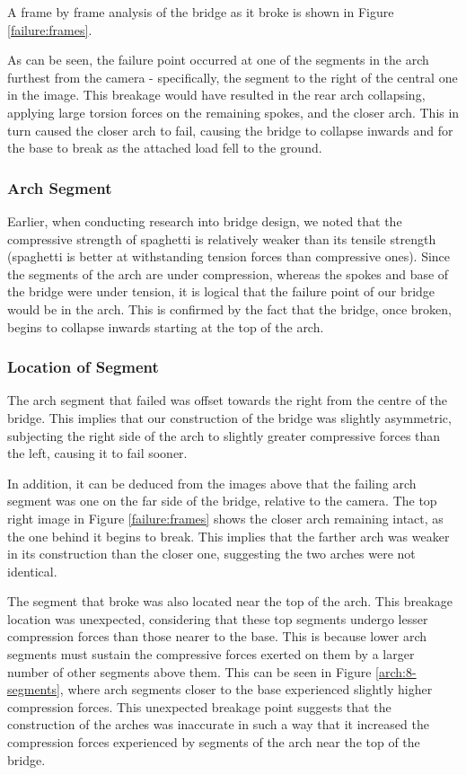 \documentclass[a4paper,11pt]{article}
\begin{document}
A frame by frame analysis of the bridge as it broke is shown in Figure
\ref{failure:frames}.

As can be seen, the failure point occurred at one of the segments in the arch
furthest from the camera - specifically, the segment to the right of the
central one in the image.
This breakage would have resulted in the rear arch collapsing, applying large
torsion forces on the remaining spokes, and the closer arch.
This in turn caused the closer arch to fail, causing the bridge to collapse
inwards and for the base to break as the attached load fell to the ground.


\subsubsection{Arch Segment}

Earlier, when conducting research into bridge design, we noted that the
compressive strength of spaghetti is relatively weaker than its tensile
strength (spaghetti is better at withstanding tension forces than compressive
ones).
Since the segments of the arch are under compression, whereas the spokes and
base of the bridge were under tension, it is logical that the failure point of
our bridge would be in the arch.
This is confirmed by the fact that the bridge, once broken, begins to collapse
inwards starting at the top of the arch.


\subsubsection{Location of Segment}

The arch segment that failed was offset towards the right from the centre of
the bridge.
This implies that our construction of the bridge was slightly asymmetric,
subjecting the right side of the arch to slightly greater compressive forces
than the left, causing it to fail sooner.

In addition, it can be deduced from the images above that the failing arch
segment was one on the far side of the bridge, relative to the camera.
The top right image in Figure \ref{failure:frames} shows the closer arch
remaining intact, as the one behind it begins to break.
This implies that the farther arch was weaker in its construction than the
closer one, suggesting the two arches were not identical.

The segment that broke was also located near the top of the arch.
This breakage location was unexpected, considering that these top segments
undergo lesser compression forces than those nearer to the base.
This is because lower arch segments must sustain the compressive forces exerted
on them by a larger number of other segments above them.
This can be seen in Figure \ref{arch:8-segments}, where arch segments closer to
the base experienced slightly higher compression forces.
This unexpected breakage point suggests that the construction of the arches was
inaccurate in such a way that it increased the compression forces experienced by
segments of the arch near the top of the bridge.
\end{document}
